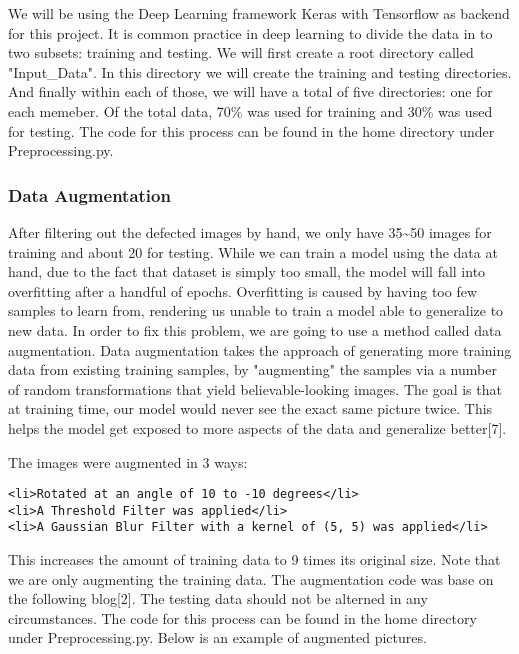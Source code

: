 \documentclass[11pt]{article}
\begin{document}
We will be using the Deep Learning framework Keras with Tensorflow as
backend for this project. It is common practice in deep learning to
divide the data in to two subsets: training and testing. We will first
create a root directory called "Input\_Data". In this directory we will
create the training and testing directories. And finally within each of
those, we will have a total of five directories: one for each memeber.
Of the total data, 70\% was used for training and 30\% was used for
testing. The code for this process can be found in the home directory
under Preprocessing.py.

    \subsubsection{Data Augmentation}\label{data-augmentation}

    After filtering out the defected images by hand, we only have
35\textasciitilde{}50 images for training and about 20 for testing.
While we can train a model using the data at hand, due to the fact that
dataset is simply too small, the model will fall into overfitting after
a handful of epochs. Overfitting is caused by having too few samples to
learn from, rendering us unable to train a model able to generalize to
new data. In order to fix this problem, we are going to use a method
called data augmentation. Data augmentation takes the approach of
generating more training data from existing training samples, by
"augmenting" the samples via a number of random transformations that
yield believable-looking images. The goal is that at training time, our
model would never see the exact same picture twice. This helps the model
get exposed to more aspects of the data and generalize better{[}7{]}.

The images were augmented in 3 ways:

\begin{verbatim}
<li>Rotated at an angle of 10 to -10 degrees</li>
<li>A Threshold Filter was applied</li>
<li>A Gaussian Blur Filter with a kernel of (5, 5) was applied</li>
\end{verbatim}

This increases the amount of training data to 9 times its original size.
Note that we are only augmenting the training data. The augmentation
code was base on the following blog{[}2{]}. The testing data should not
be alterned in any circumstances. The code for this process can be found
in the home directory under Preprocessing.py. Below is an example of
augmented pictures.
\end{document}
